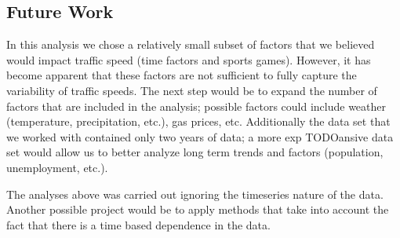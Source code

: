 \documentclass[12pt]{article}
\begin{document}
\subsection{Future Work}
In this analysis we chose a relatively small subset of factors that we believed would impact traffic speed (time factors and sports games). However, it has become apparent that these factors are not sufficient to fully capture the variability of traffic speeds. The next step would be to expand the number of factors that are included in the analysis; possible factors could include weather (temperature, precipitation, etc.), gas prices, etc. Additionally the data set that we worked with contained only two years of data; a more exp
TODOansive data set would allow us to better analyze long term trends and factors (population, unemployment, etc.). 

The analyses above was carried out ignoring the timeseries nature of the data. Another possible project would be to apply methods that take into account the fact that there is a time based dependence in the data.
\end{document}
